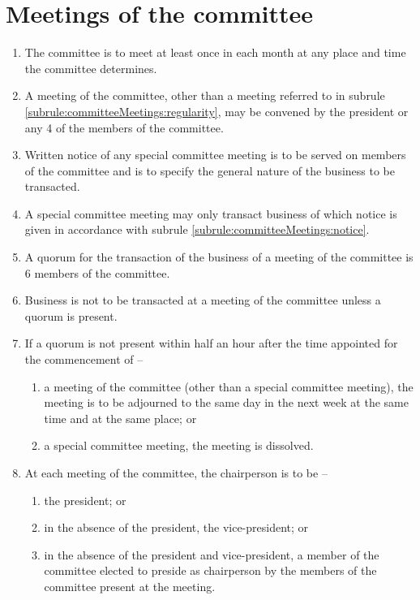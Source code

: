 \section{Meetings of the committee}
\label{rule:committeeMeetings}

\begin{enumerate}
	\item \label{subrule:committeeMeetings:regularity} The committee is to meet at least once in each month at any place and time the committee determines.
	\item A meeting of the committee, other than a meeting referred to in subrule \ref{subrule:committeeMeetings:regularity}, may be convened by the president or any 4 of the members of the committee.
	\item \label{subrule:committeeMeetings:notice} Written notice of any special committee meeting is to be served on members of the committee and is to specify the general nature of the business to be transacted.
	\item A special committee meeting may only transact business of which notice is given in accordance with subrule \ref{subrule:committeeMeetings:notice}.
	\item A quorum for the transaction of the business of a meeting of the committee is 6 members of the committee.
	\item Business is not to be transacted at a meeting of the committee unless a quorum is present.
	
	\item If a quorum is not present within half an hour after the time appointed for the commencement of --
	\begin{enumerate}
		\item a meeting of the committee (other than a special committee meeting), the meeting is to be adjourned to the same day in the next week at the same time and at the same place; or
		\item a special committee meeting, the meeting is dissolved.
	\end{enumerate}
	
	\item At each meeting of the committee, the chairperson is to be --
	\begin{enumerate}
		\item the president; or
		\item in the absence of the president, the vice-president; or
		\item in the absence of the president and vice-president, a member of the committee elected to preside as chairperson by the members of the committee present at the meeting.
	\end{enumerate}
	

\end{enumerate}
